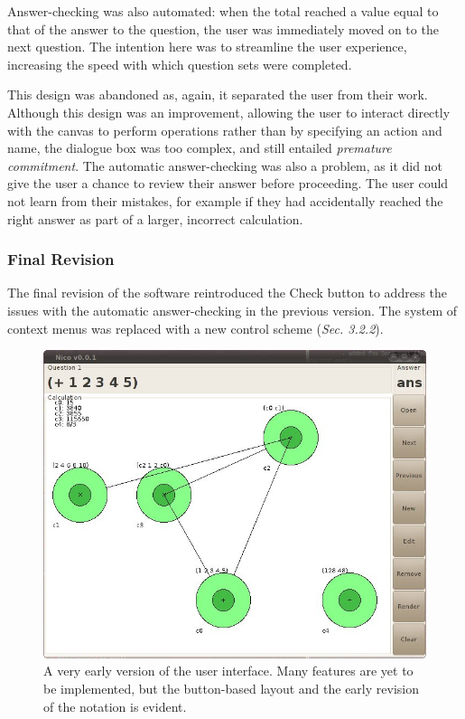 \documentclass[12pt,twoside,notitlepage,xetex]{report}
\begin{document}
{Answer-checking was also automated: when the total reached a value equal to that of the answer to the question, the user was immediately moved on to the next question.  The intention here was to streamline the user experience, increasing the speed with which question sets were completed.

This design was abandoned as, again, it separated the user from their work.  Although this design was an improvement, allowing the user to interact directly with the canvas to perform operations rather than by specifying an action and name, the dialogue box was too complex, and still entailed \emph{premature commitment}.  The automatic answer-checking was also a problem, as it did not give the user a chance to review their answer before proceeding.  The user could not learn from their mistakes, for example if they had accidentally reached the right answer as part of a larger, incorrect calculation.

\subsubsection{Final Revision}

The final revision of the software reintroduced the {\sfapp Check} button to address the issues with the automatic answer-checking in the previous version.  The system of context menus was replaced with a new control scheme (\emph{Sec. 3.2.2}).

\begin{center}
\begin{figure}[H]
\begin{center}
\includegraphics[width=\textwidth-4cm]{figs/nico_screen_oldest.png}
\end{center}
\caption{A very early version of the user interface.  Many features are yet to be implemented, but the button-based layout and the early revision of the notation is evident.}
\label{fig:OldApps1}
\end{figure}
\end{center}

}
\end{document}

